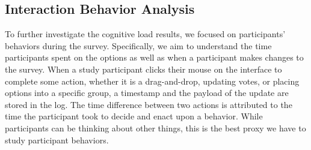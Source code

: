 \subsection{Interaction Behavior Analysis}
To further investigate the cognitive load results, we focused on participants' behaviors during the survey. Specifically, we aim to understand the time participants spent on the options as well as when a participant makes changes to the survey. When a study participant clicks their mouse on the interface to complete some action, whether it is a drag-and-drop, updating votes, or placing options into a specific group, a timestamp and the payload of the update are stored in the log. The time difference between two actions is attributed to the time the participant took to decide and enact upon a behavior. While participants can be thinking about other things, this is the best proxy we have to study participant behaviors.

